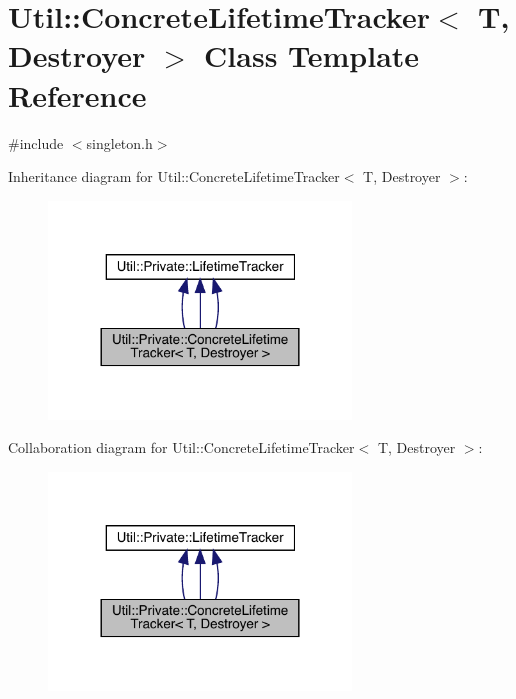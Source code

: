 \hypertarget{classUtil_1_1Private_1_1ConcreteLifetimeTracker}{}\section{Util\+:\+:Concrete\+Lifetime\+Tracker$<$ T, Destroyer $>$ Class Template Reference}
\label{classUtil_1_1Private_1_1ConcreteLifetimeTracker}


{\ttfamily \#include $<$singleton.\+h$>$}



Inheritance diagram for Util\+:\+:Concrete\+Lifetime\+Tracker$<$ T, Destroyer $>$\+:
\nopagebreak
\begin{figure}[H]
\begin{center}
\leavevmode
\includegraphics[width=228pt]{d5/d11/classUtil_1_1Private_1_1ConcreteLifetimeTracker__inherit__graph}
\end{center}
\end{figure}


Collaboration diagram for Util\+:\+:Concrete\+Lifetime\+Tracker$<$ T, Destroyer $>$\+:
\nopagebreak
\begin{figure}[H]
\begin{center}
\leavevmode
\includegraphics[width=228pt]{d9/db3/classUtil_1_1Private_1_1ConcreteLifetimeTracker__coll__graph}
\end{center}
\end{figure}

